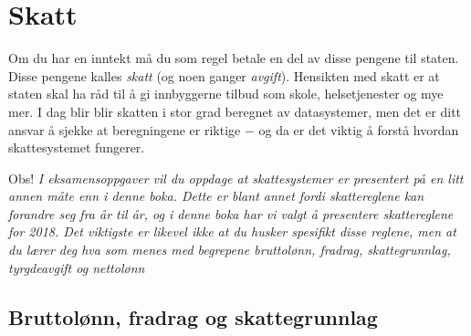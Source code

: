 \section{Skatt}
Om du har en inntekt må du som regel betale en del av disse pengene til staten. Disse pengene kalles \textit{skatt} (og noen ganger \textit{avgift}). Hensikten med skatt er at staten skal ha råd til å gi innbyggerne tilbud som skole, helsetjenester og mye mer. I dag blir blir skatten i stor grad beregnet av datasystemer, men det er ditt ansvar å sjekke at beregningene er riktige $ - $ og da er det viktig å forstå hvordan skattesystemet fungerer.\vsk

Obs! \textsl{I eksamensoppgaver vil du oppdage at skattesystemer er presentert på en litt annen måte enn i denne boka. Dette er blant annet fordi skattereglene kan forandre seg fra år til år, og i denne boka har vi valgt å presentere skattereglene for 2018. Det viktigste er likevel ikke at du husker spesifikt disse reglene, men at du lærer deg hva som menes med begrepene \textit{bruttolønn, fradrag, skattegrunnlag, tyrgdeavgift} og \textit{nettolønn}}
\subsection{Bruttolønn, fradrag og skattegrunnlag}
\qquad
{} \\[-6pt]
\qquad
{}\regv

